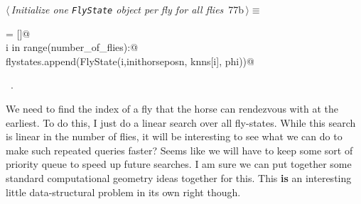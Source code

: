 \documentclass[11.5pt]{report}
\begin{document}
\vspace{-0.8cm} \newchunk
\begin{flushleft} \small
\begin{minipage}{\linewidth}\label{scrap116}\raggedright\small
{} $\langle\,${\itshape Initialize one \verb|FlyState| object per fly for all flies}\nobreak\ {\footnotesize {77b}}$\,\rangle\equiv$
\vspace{-1ex}
\begin{list}{}{} \item
\mbox{}\verb@flystates = []@\\
\mbox{}\verb@for i in range(number_of_flies):@\\
\mbox{}\verb@    flystates.append(FlyState(i,inithorseposn, knns[i], phi))@\\
\mbox{}\verb@@{\NWsep}
\end{list}
\vspace{-1.5ex}
\footnotesize
\begin{list}{}{\setlength{\itemsep}{-\parsep}\setlength{\itemindent}{-\leftmargin}}
\item \NWtxtMacroRefIn\ .

\item{}
\end{list}
\end{minipage}\vspace{4ex}
\end{flushleft}

\vspace{-0.8cm} \newchunk We need to find the index of a fly that the horse can rendezvous with at the earliest. To do this, I just
do a linear search over all fly-states. While this search is linear in the number of flies, it will be interesting to see what 
we can do to make such repeated queries faster? Seems like we will have to keep some sort of priority 
queue to speed up future searches. I am sure we can put together some standard computational geometry ideas together 
for this. This \textbf{is} an interesting little data-structural problem in its own right though. 
\end{document}
